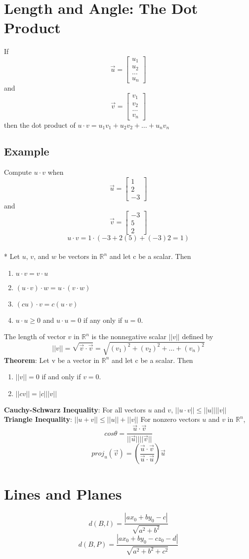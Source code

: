 \section{Length and Angle: The Dot Product}
If $$\vec{u} = \begin{bmatrix}
    u_1\\u_2\\\dots\\u_n
\end{bmatrix}$$ and $$\vec{v} = \begin{bmatrix}
    v_1\\v_2\\\dots\\v_n
\end{bmatrix}$$
then the dot product of $u\cdot v = u_1v_1+u_2v_2 + \dots + u_nv_n$
\subsection*{Example}
Compute $u\cdot v$ when
$$\vec{u} = \begin{bmatrix}
    1\\2\\-3
\end{bmatrix}$$ and $$\vec{v} = \begin{bmatrix}
    -3\\5\\2
\end{bmatrix}$$
$$u\cdot v = 1\cdot(-3 + 2(5) + (-3)2 = 1)$$\\*
Let $u$, $v$, and $w$ be vectors in $\mathbb{R}^n$ and let c be a scalar. Then\begin{enumerate}
    \item $u\cdot v = v\cdot u$
    \item $(u\cdot v)\cdot w = u\cdot(v\cdot w)$
    \item $(cu)\cdot v = c(u\cdot v)$
    \item $u\cdot u \geq 0$ and $u\cdot u = 0$ if any only if $u=0$.
\end{enumerate}
The length of vector $v$ in $\mathbb{R}^n$ is the nonnegative scalar $||v||$ defined by
$$||v|| = \sqrt{\vec{v}\cdot \vec{v}} = \sqrt{(v_1)^2 + (v_2)^2 + \dots + (v_n)^2}$$
\textbf{Theorem}: Let v be a vector in $\mathbb{R}^n$ and let c be a scalar. Then\\
\begin{enumerate}
    \item $||v|| = 0$ if and only if $v=0$.
    \item $||cv|| = |c|||v||$
\end{enumerate}
\textbf{Cauchy-Schwarz Inequality}: For all vectors $u$ and $v$, $||u\cdot v|| \leq ||u||||v||$
\textbf{Triangle Inequality}: $||u+v||\leq ||u|| + ||v||$
For nonzero vectors $u$ and $v$ in $\mathbb{R}^n$, 
$$cos \theta = \frac{\vec{u}\cdot \vec{v}}{||\vec{u}|| ||\vec{v}||}$$
$$proj_u(\vec{v}) = (\frac{\vec{u}\cdot \vec{v}}{\vec{u}\cdot \vec{u}})\vec{u}$$

\section{Lines and Planes}
$$d(B, l) = \frac{|ax_0 +by_0 - c|}{\sqrt{a^2+b^2}}$$
$$d(B, P) = \frac{|ax_0 +by_0 - cz_0 - d|}{\sqrt{a^2+b^2+c^2}}$$

